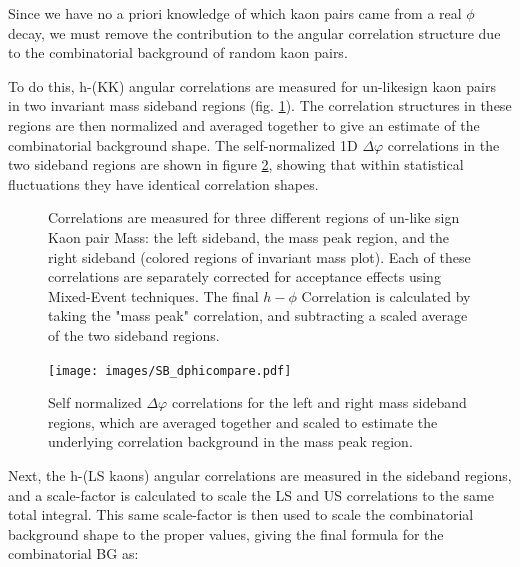 \documentclass[ALICE,manyauthors]{ALICE_analysis_notes}
\begin{document}
Since we have no a priori knowledge of which kaon pairs came from a real $\phi$ decay, we must remove the contribution to the angular correlation structure due to the combinatorial background of random kaon pairs.

To do this, h-(KK) angular correlations are measured for un-likesign kaon pairs in two invariant mass sideband regions (fig. \ref{sidebands}).  The correlation structures in these regions are then normalized and averaged together to give an estimate of the combinatorial background shape.  The self-normalized 1D $\Delta\varphi$ correlations in the two sideband regions are shown in figure \ref{normSBcorr}, showing that within statistical fluctuations they have identical correlation shapes.

\begin{figure}[ht]
\centering
\begin{subfigure}{
\texttt{[image: images/narrowmass\_withSB\_invmass.pdf]}}
\end{subfigure}
\begin{subfigure}{
\texttt{[image: images/dphi\_masspeak.pdf]}}
\end{subfigure}
\begin{subfigure}{
\texttt{[image: images/dphi\_LSB.pdf]}}
\end{subfigure}
\begin{subfigure}{
\texttt{[image: images/dphi\_RSB.pdf]}}
\end{subfigure}
\caption{Correlations are measured for three different regions of un-like sign Kaon pair Mass: the left sideband, the mass peak region, and the right sideband (colored regions of invariant mass plot). Each of these correlations are separately corrected for acceptance effects using Mixed-Event techniques. The final $h-\phi$ Correlation is calculated by taking the "mass peak" correlation, and subtracting a scaled average of the two sideband regions.}
\label{sidebands}
\end{figure}

\begin{figure}[ht]
\centering
\label{normSBcorr}
\texttt{[image: images/SB\_dphicompare.pdf]}
\caption{Self normalized $\Delta\varphi$ correlations for the left and right mass sideband regions, which are averaged together and scaled to estimate the underlying correlation background in the mass peak region.}
\end{figure}

Next, the h-(LS kaons) angular correlations are measured in the sideband regions, and a scale-factor is calculated to scale the LS and US correlations to the same total integral.  This same scale-factor is then used to scale the combinatorial background shape to the proper values, giving the final formula for the combinatorial BG as:
\end{document}

